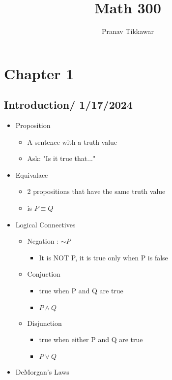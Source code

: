 \documentclass{article}
\author{Pranav Tikkawar}
\title{Math 300}
\begin{document}
\maketitle

\section{Chapter 1}
\subsection{Introduction/ 1/17/2024}

\begin{itemize}
    \item Proposition 
    \begin{itemize}
        \item A sentence with a truth value
        \item Ask: "Is it true that..."
    \end{itemize}
    \item Equivalace
    \begin{itemize}
        \item 2 propositions that have the same truth value
        \item is $P \equiv Q$
    \end{itemize}
    \item Logical Connectives
    \begin{itemize}
        \item Negation : $\sim P$ 
        \begin{itemize}
            \item It is NOT P, it is true only when P is false
        \end{itemize}
        \item Conjuction
        \begin{itemize}
            \item true when P and Q are true
            \item $P \land Q$
        \end{itemize}
        \item Disjunction
        \begin{itemize}
            \item true when either P and Q are true
            \item $P \lor Q$
        \end{itemize}
    \end{itemize}
    \item DeMorgan's Laws

\end{itemize}
\end{document}
